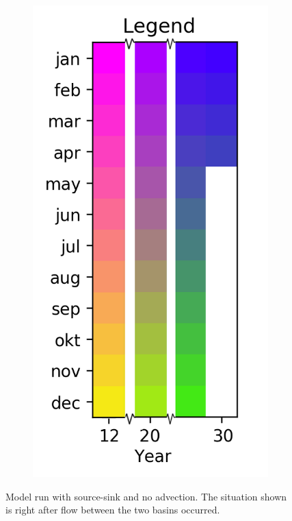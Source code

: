 \documentclass[twocolumn]{article}
\begin{document}
\begin{figure}
\begin{subfigure}[h]{0.23\textwidth}
\includegraphics[width=\textwidth,keepaspectratio]{12-30_reduced_legend.png}
\end{subfigure}\hfill
\caption{Model run with source-sink and no advection. The situation shown is right after flow between the two basins occurred.}
\label{fig:no_adv}
\end{figure}
\end{document}

